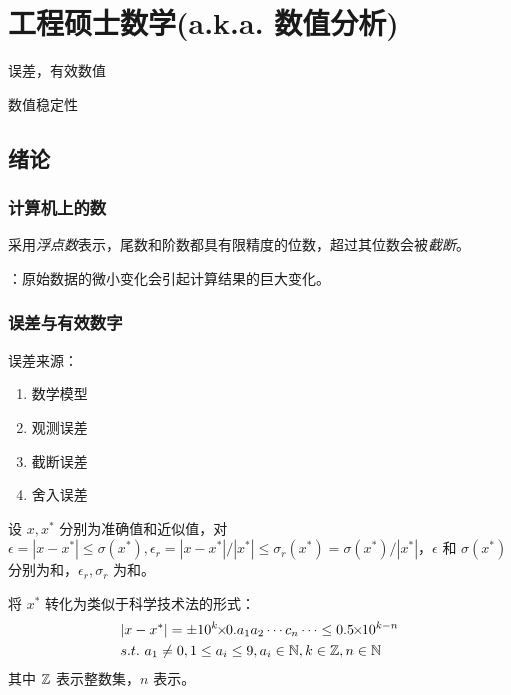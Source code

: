 \chapter{工程硕士数学(a.k.a. 数值分析)}
\label{chap:numerical_analysis}


\begin{learningobjectives}
	\item 误差，有效数值
	\item 数值稳定性
\end{learningobjectives}


\section{绪论}

\subsection{计算机上的数}

采用\emph{浮点数}表示，尾数和阶数都具有限精度的位数，超过其位数会被\emph{截断}。

：原始数据的微小变化会引起计算结果的巨大变化。

\subsection{误差与有效数字}

误差来源：

\begin{enumerate}
	\item 数学模型
	\item 观测误差
	\item 截断误差
	\item 舍入误差
\end{enumerate}

设 $x, x^*$ 分别为准确值和近似值，对 $\epsilon = |x - x^*| \le \sigma(x^*), \epsilon_r = |x - x^*| / |x^*| \le \sigma_r(x^*) = \sigma(x^*) / |x^*|$，$\epsilon$ 和 $\sigma(x^*)$ 分别为和，$\epsilon_r, \sigma_r$ 为和。

将 $x^*$ 转化为类似于科学技术法的形式：
\begin{align*}
	&|x - x^*| = \pm 10^k \times 0.a_1a_2 \cdots c_n \cdots \le 0.5 \times 10^{k-n} \\
	&s.t.\ a_1 \ne 0,  1 \le a_i \le 9, a_i \in \N, k \in \Z, n \in \N
\end{align*}
其中 $\mathbb{Z}$ 表示整数集，$n$ 表示。

